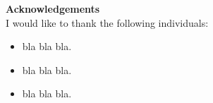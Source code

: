{\Large\textbf{Acknowledgements}}\\

I would like to thank the following individuals:\\

\begin{itemize}
    \item bla bla bla.
    \item bla bla bla.
    \item bla bla bla.
\end{itemize}


